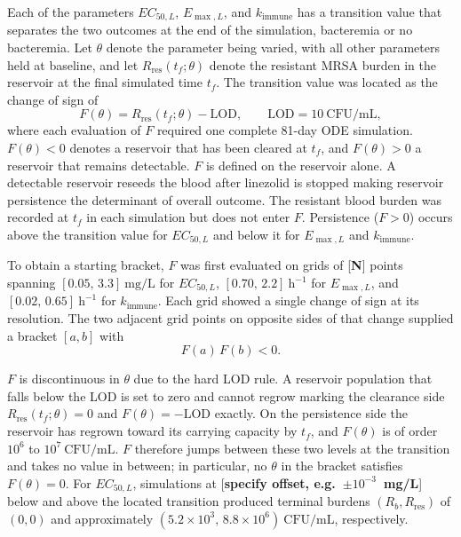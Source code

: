 \documentclass[journal]{IEEEtran}
\begin{document}
Each of the parameters $EC_{50,L}$, $E_{\max,L}$, and $k_{\mathrm{immune}}$ has
a transition value that separates the two outcomes at the end of the
simulation, bacteremia or no bacteremia. Let $\theta$ denote
the parameter being varied, with all other parameters held at baseline, and let
$R_{\mathrm{res}}(t_f;\theta)$ denote the resistant MRSA burden in the
reservoir at the final simulated time $t_f$. The transition value was located
as the change of sign of
\begin{equation}
    F(\theta) = R_{\mathrm{res}}(t_f;\theta) - \mathrm{LOD},
    \qquad \mathrm{LOD} = 10~\mathrm{CFU/mL},
    \label{eq:brent-objective}
\end{equation}
where each evaluation of $F$ required one complete 81-day ODE simulation.
$F(\theta) < 0$ denotes a reservoir that has been cleared at $t_f$, and
$F(\theta) > 0$ a reservoir that remains detectable. $F$ is defined on the
reservoir alone.  A detectable reservoir reseeds the blood after
linezolid is stopped making reservoir persistence the determinant of overall outcome.
The resistant blood burden was recorded at $t_f$ in each simulation but does
not enter $F$. Persistence ($F > 0$) occurs above the transition value for
$EC_{50,L}$ and below it for $E_{\max,L}$ and $k_{\mathrm{immune}}$.

To obtain a starting bracket, $F$ was first evaluated on grids of
[\textbf{N}] points spanning $[0.05,\, 3.3]~\mathrm{mg/L}$ for $EC_{50,L}$,
$[0.70,\, 2.2]~\mathrm{h}^{-1}$ for $E_{\max,L}$, and
$[0.02,\, 0.65]~\mathrm{h}^{-1}$ for $k_{\mathrm{immune}}$. Each grid showed a
single change of sign at its resolution. The two adjacent grid points on
opposite sides of that change supplied a bracket $[a,b]$ with
\begin{equation}
    F(a)\,F(b) < 0.
    \label{eq:brent-bracket}
\end{equation}

$F$ is discontinuous in $\theta$ due to the hard LOD rule. A reservoir
population that falls below the LOD is set to zero and cannot regrow marking
the clearance side $R_{\mathrm{res}}(t_f;\theta) = 0$ and
$F(\theta) = -\mathrm{LOD}$ exactly. On the persistence side the reservoir has
regrown toward its carrying capacity by $t_f$, and $F(\theta)$ is of order
$10^{6}$ to $10^{7}~\mathrm{CFU/mL}$. $F$ therefore jumps between these two
levels at the transition and takes no value in between; in particular, no
$\theta$ in the bracket satisfies $F(\theta) = 0$. For $EC_{50,L}$, simulations
at [\textbf{specify offset, e.g.\ $\pm 10^{-3}$~mg/L}] below and above the
located transition produced terminal burdens $(R_b, R_{\mathrm{res}})$ of
$(0,0)$ and approximately $(5.2 \times 10^{3},\, 8.8 \times 10^{6})~\mathrm{CFU/mL}$,
respectively.
\end{document}
